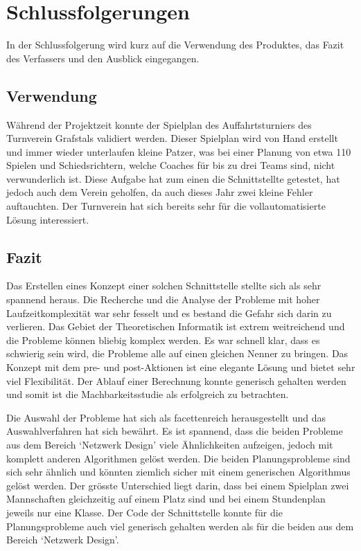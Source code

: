 %
%


\chapter{Schlussfolgerungen}\label{chap.Schlussfolgerungen}
In der Schlussfolgerung wird kurz auf die Verwendung des Produktes, das Fazit des Verfassers und den Ausblick eingegangen.

\section{Verwendung}\label{fazit_verwendung}
Während der Projektzeit konnte der Spielplan des Auffahrtsturniers des Turnverein Grafstals validiert werden. Dieser Spielplan wird von Hand erstellt und immer wieder unterlaufen 
kleine Patzer, was bei einer Planung von etwa 110 Spielen und Schiedsrichtern, welche Coaches für bis zu drei Teams sind, nicht verwunderlich ist. Diese Aufgabe hat zum einen die Schnittstellte 
getestet, hat jedoch auch dem Verein geholfen, da auch dieses Jahr zwei kleine Fehler auftauchten. Der Turnverein hat sich bereits sehr für die vollautomatisierte Lösung interessiert.

\section{Fazit}\label{fazit}

Das Erstellen eines Konzept einer solchen Schnittstelle stellte sich als sehr spannend heraus. Die Recherche und die Analyse der Probleme mit hoher Laufzeitkomplexität war sehr fesselt und es 
bestand die Gefahr sich darin zu verlieren. Das Gebiet der Theoretischen Informatik ist extrem weitreichend und die Probleme können bliebig komplex werden. Es war schnell klar, dass es schwierig 
sein wird, die Probleme alle auf einen gleichen Nenner zu bringen. Das Konzept mit dem pre- und post-Aktionen ist eine elegante Lösung und bietet sehr viel Flexibilität. Der Ablauf einer Berechnung 
konnte generisch gehalten werden und somit ist die Machbarkeitsstudie als erfolgreich zu betrachten.

Die Auswahl der Probleme hat sich als facettenreich herausgestellt und das Auswahlverfahren hat sich bewährt. Es ist spannend, dass die beiden Probleme aus dem Bereich `Netzwerk Design' 
viele Ähnlichkeiten aufzeigen, jedoch mit komplett anderen Algorithmen gelöst werden. Die beiden Planungsprobleme sind sich sehr ähnlich und könnten ziemlich sicher mit einem generischen 
Algorithmus gelöst werden. Der grösste Unterschied liegt darin, dass bei einem Spielplan zwei Mannschaften gleichzeitig auf einem Platz sind und bei einem 
Stundenplan jeweils nur eine Klasse. Der Code der Schnittstelle konnte für die Planungsprobleme auch viel generisch gehalten werden als für die beiden aus dem Bereich `Netzwerk Design'.

